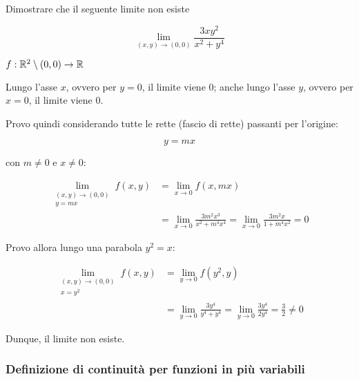 Dimostrare che il seguente limite non esiste

\[
    \lim_{ (x,y) \to (0,0) } \frac{3xy^{2}}{x^{2}+y^{4}}
\]

\(f:\mathbb{R}^{2}\setminus (0,0) \rightarrow \mathbb{R} \)

Lungo l'asse \(x\), ovvero per \(y=0\), il limite viene 0; anche lungo l'asse \(y\), ovvero per \(x=0\), il limite viene 0.

Provo quindi considerando tutte le rette (fascio di rette) passanti per l'origine:

\[
    y= mx
\]

con \(m \neq 0\) e \(x \neq 0\):

\begin{align*}
    \lim_{\begin{smallmatrix} (x,y) \to (0,0) \\ y=mx \end{smallmatrix}} f(x,y) & = \lim_{ x \to 0 } f(x,mx)                                                                  \\
                                                                                & = \lim_{ x \to 0 } \frac{3m^2x^3}{x^2+m^4x^4} = \lim_{ x \to 0 } \frac{3m^2x}{1+m^4x^2} = 0
\end{align*}

Provo allora lungo una parabola \(y^{2}=x\):

\begin{align*}
    \lim_{\begin{smallmatrix} (x,y) \to (0,0) \\ x=y^{2} \end{smallmatrix}} f(x,y) & = \lim_{ y \to 0 } f(y^{2},y)                                                                                    \\
                                                                                   & = \lim_{ y \to 0 } \frac{3y^{4}}{y^{4}+y^{4}} = \lim_{ y \to 0 } \frac{3y^{4}}{2y^{4}}      = \frac{3}{2} \neq 0
\end{align*}

Dunque, il limite non esiste.

\pagebreak

\subsubsection{Definizione di continuità per funzioni in più variabili}


